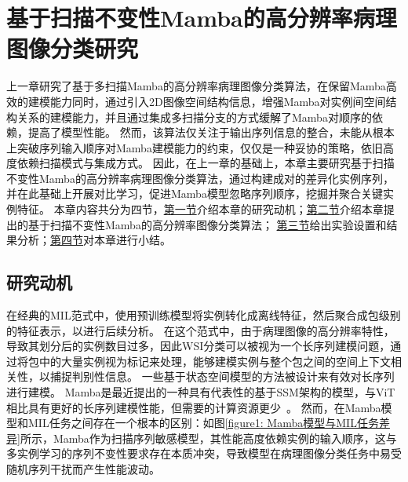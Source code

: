 \chapter[\hspace{0pt}基于扫描不变性Mamba的高分辨率病理图像分类研究]{{\heiti{}\hspace{0pt}基于扫描不变性Mamba的高分辨率病理图像分类研究}}\label{chapter4: 基于扫描不变性Mamba的高分辨率病理图像分类研究}
\removelofgap
\removelotgap

上一章研究了基于多扫描Mamba的高分辨率病理图像分类算法，在保留Mamba高效的建模能力同时，通过引入2D图像空间结构信息，增强Mamba对实例间空间结构关系的建模能力，并且通过集成多扫描分支的方式缓解了Mamba对顺序的依赖，提高了模型性能。
然而，该算法仅关注于输出序列信息的整合，未能从根本上突破序列输入顺序对Mamba建模能力的约束，仅仅是一种妥协的策略，依旧高度依赖扫描模式与集成方式。
因此，在上一章的基础上，本章主要研究基于扫描不变性Mamba的高分辨率病理图像分类算法，通过构建成对的差异化实例序列，并在此基础上开展对比学习，促进Mamba模型忽略序列顺序，挖掘并聚合关键实例特征。
本章内容共分为四节，\hyperref[section4: 研究动机]{第一节}介绍本章的研究动机；\hyperref[section4: 基于序列差异化对比的Mamba模型]{第二节}介绍本章提出的基于扫描不变性Mamba的高分辨率图像分类算法；
\hyperref[section4: 实验设置及结果分析]{第三节}给出实验设置和结果分析；\hyperref[section4: 本章小结]{第四节}对本章进行小结。



\section[\hspace{-2pt}研究动机]{{\heiti{} \hspace{-8pt}研究动机}}\label{section4: 研究动机}

在经典的MIL范式中，使用预训练模型将实例转化成离线特征，然后聚合成包级别的特征表示，以进行后续分析。
在这个范式中，由于病理图像的高分辨率特性，导致其划分后的实例数目过多，因此WSI分类可以被视为一个长序列建模问题，通过将包中的大量实例视为标记来处理，能够建模实例与整个包之间的空间上下文相关性，以捕捉判别性信息。
一些基于状态空间模型的方法被设计来有效对长序列进行建模。
Mamba是最近提出的一种具有代表性的基于SSM架构的模型，与ViT相比具有更好的长序列建模性能，但需要的计算资源更少~\cite{zhu2024vision}。
然而，在Mamba模型和MIL任务之间存在一个根本的区别：如图\ref{figure1: Mamba模型与MIL任务差异}所示，Mamba作为扫描序列敏感模型，其性能高度依赖实例的输入顺序，这与多实例学习的序列不变性要求存在本质冲突，导致模型在病理图像分类任务中易受随机序列干扰而产生性能波动。


